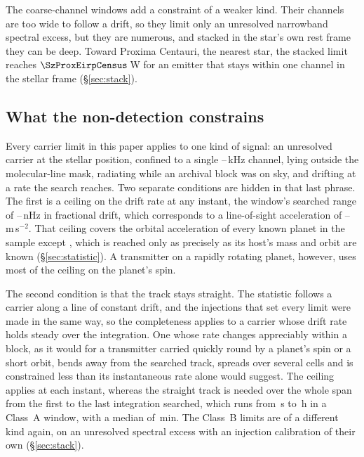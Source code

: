 The \NCoarse{} coarse-channel windows add a constraint of a weaker kind.
Their channels are too wide to follow a drift, so they limit only an
unresolved narrowband spectral excess, but they are numerous, and stacked in
the star's own rest frame they can be deep. Toward Proxima Centauri, the
nearest star, the stacked limit reaches $\SzProxEirpCensus$\,W for an
emitter that stays within one channel in the stellar frame
(\S\ref{sec:stack}).

\subsection{What the non-detection constrains}
\label{sec:excludes}

Every carrier limit in this paper applies to one kind of signal: an unresolved
carrier at the stellar position, confined to a single
\ChanLoA--\ChanHiA\,kHz channel, lying outside the molecular-line mask,
radiating while an archival block was on sky, and drifting at a rate the
search reaches. Two separate conditions are hidden in that last phrase. The
first is a ceiling on the drift rate at any instant, the window's searched
range of \DriftCeilLo--\DriftCeilHi\,nHz in fractional drift, which
corresponds to a line-of-sight acceleration of
\AccelCeilMed--\AccelCeilMax\,m\,s$^{-2}$. That ceiling covers
the orbital acceleration of every known planet in the sample except
\AccelWorstName, which is reached only as precisely as its host's mass and
orbit are known (\S\ref{sec:statistic}). A transmitter on a rapidly rotating
planet, however, uses most of the ceiling on the planet's spin.

The second condition is that the track stays straight. The statistic
follows a carrier along a line of constant drift, and the injections that
set every limit were made in the same way, so the completeness applies to a
carrier whose drift rate holds steady over the integration. One whose rate
changes appreciably within a block, as it would for a transmitter carried
quickly round by a planet's spin or a short orbit, bends away from the
searched track, spreads over several cells and is constrained less than its
instantaneous rate alone would suggest. The ceiling applies at each
instant, whereas the straight track is needed over the whole span from the
first to the last integration searched, which runs from \AcTrackLoS\,s to
\AcTrackHiH\,h in a Class~A window, with a median of \AcTrackMedMin\,min. The Class~B
limits are of a different kind again, on an unresolved spectral excess with
an injection calibration of their own (\S\ref{sec:stack}).

